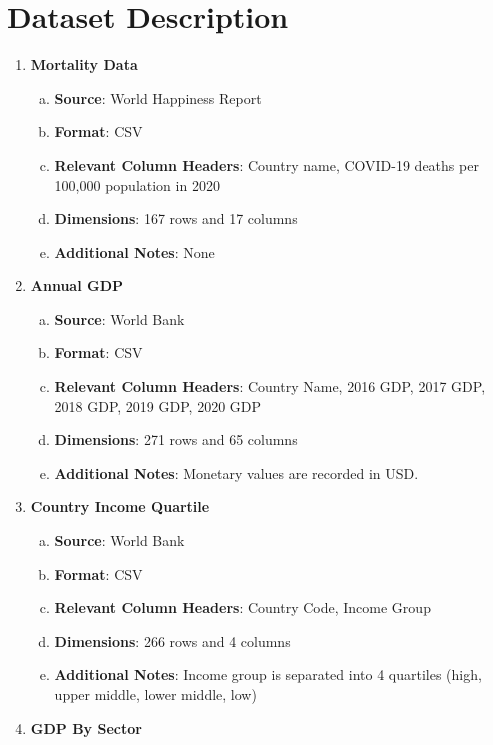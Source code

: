\documentclass[fontsize=11pt]{article}
\begin{document}
\section*{Dataset Description}
\begin{enumerate}
    \item \textbf{Mortality Data}
        \begin{enumerate}[(a)]
            \item \textbf{Source}: World Happiness Report
            \item \textbf{Format}: CSV
            \item \textbf{Relevant Column Headers}: Country name, COVID-19 deaths per 100,000 population in 2020
            \item \textbf{Dimensions}: 167 rows and 17 columns
            \item \textbf{Additional Notes}: None
        \end{enumerate}
    \item \textbf{Annual GDP}
        \begin{enumerate}[(a)]
            \item \textbf{Source}: World Bank
            \item \textbf{Format}: CSV
            \item \textbf{Relevant Column Headers}: Country Name, 2016 GDP, 2017 GDP, 2018 GDP, 2019 GDP, 2020 GDP
            \item \textbf{Dimensions}: 271 rows and 65 columns
            \item \textbf{Additional Notes}: Monetary values are recorded in USD.
        \end{enumerate}
    \item \textbf{Country Income Quartile}
        \begin{enumerate}[(a)]
            \item \textbf{Source}: World Bank
            \item \textbf{Format}: CSV
            \item \textbf{Relevant Column Headers}: Country Code, Income Group
            \item \textbf{Dimensions}: 266 rows and 4 columns
            \item \textbf{Additional Notes}: Income group is separated into 4 quartiles (high, upper middle, lower middle, low)
        \end{enumerate}
    \item \textbf{GDP By Sector}
        \begin{enumerate}[(a)]

\end{enumerate}
\end{enumerate}
\end{document}
